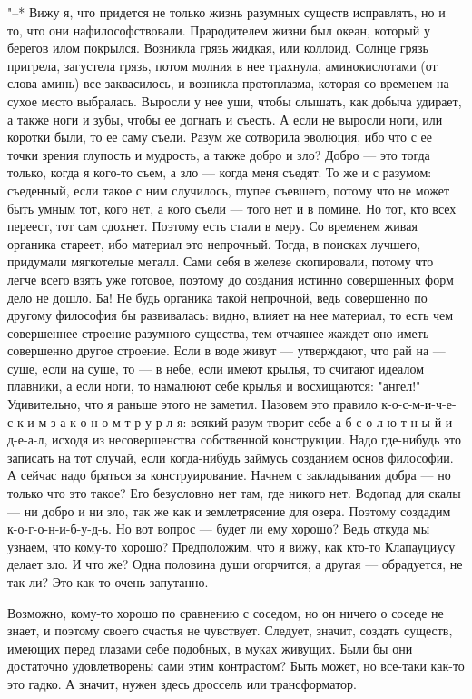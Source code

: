 "--* Вижу я, что придется не только жизнь разумных существ
исправлять, но и то, что они нафилософствовали. Прародителем
жизни был океан, который у берегов илом покрылся. Возникла
грязь жидкая, или коллоид. Солнце грязь пригрела, загустела
грязь, потом молния в нее трахнула, аминокислотами (от слова
аминь) все заквасилось, и возникла протоплазма, которая со
временем на сухое место выбралась. Выросли у нее уши, чтобы
слышать, как добыча удирает, а также ноги и зубы, чтобы ее
догнать и съесть. А если не выросли ноги, или коротки были,
то ее саму съели. Разум же сотворила эволюция, ибо что с ее
точки зрения глупость и мудрость, а также добро и зло? Добро --- это
тогда только, когда я кого-то съем, а зло --- когда
меня съедят. То же и с разумом: съеденный, если такое с ним
случилось, глупее съевшего, потому что не может быть умным
тот, кого нет, а кого съели --- того нет и в помине. Но тот,
кто всех переест, тот сам сдохнет. Поэтому есть стали в
меру. Со временем живая органика стареет, ибо материал это
непрочный. Тогда, в поисках лучшего, придумали мягкотелые
металл. Сами себя в железе скопировали, потому что легче
всего взять уже готовое, поэтому до создания истинно
совершенных форм дело не дошло. Ба! Не будь органика такой
непрочной, ведь совершенно по другому философия бы
развивалась: видно, влияет на нее материал, то есть чем
совершеннее строение разумного существа, тем отчаянее жаждет
оно иметь совершенно другое строение. Если в воде живут --- утверждают,
что рай на --- суше, если на суше, то --- в небе,
если имеют крылья, то считают идеалом плавники, а если ноги,
то намалюют себе крылья и восхищаются: "ангел!" Удивительно,
что я раньше этого не заметил. Назовем это правило
к-о-с-м-и-ч-е-с-к-и-м з-а-к-о-н-о-м т-р-у-р-л-я: всякий
разум творит себе а-б-с-о-л-ю-т-н-ы-й и-д-е-а-л, исходя из
несовершенства собственной конструкции. Надо где-нибудь это
записать на тот случай, если когда-нибудь займусь созданием
основ философии. А сейчас надо браться за конструирование.
Начнем с закладывания добра --- но только что это такое? Его
безусловно нет там, где никого нет. Водопад для скалы --- ни
добро и ни зло, так же как и землетрясение для озера.
Поэтому создадим к-о-г-о-н-и-б-у-д-ь. Но вот вопрос --- будет
ли ему хорошо? Ведь откуда мы узнаем, что кому-то хорошо?
Предположим, что я вижу, как кто-то Клапауциусу делает зло.
И что же? Одна половина души огорчится, а другая --- обрадуется,
не так ли? Это как-то очень запутанно.

Возможно, кому-то хорошо по сравнению с соседом, но он
ничего о соседе не знает, и поэтому своего счастья не
чувствует. Следует, значит, создать существ, имеющих перед
глазами себе подобных, в муках живущих. Были бы они
достаточно удовлетворены сами этим контрастом? Быть может,
но все-таки как-то это гадко. А значит, нужен здесь дроссель
или трансформатор.

